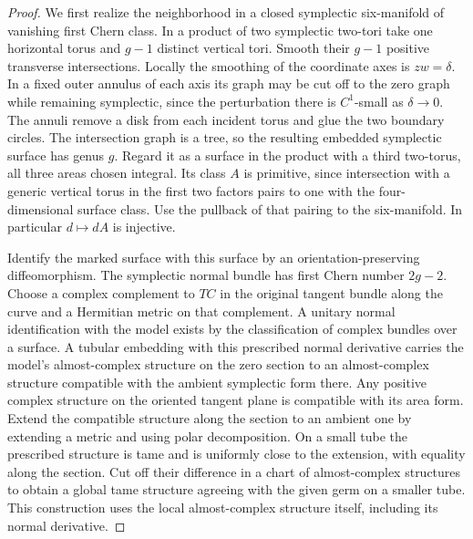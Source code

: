 \begin{proof}
We first realize the neighborhood in a closed symplectic six-manifold
of vanishing first Chern class. In a product of two symplectic
two-tori take one horizontal torus and $g-1$ distinct vertical tori.
Smooth their $g-1$ positive transverse intersections. Locally the
smoothing of the coordinate axes is $zw=\delta$. In a fixed outer
annulus of each axis its graph may be cut off to the zero graph while
remaining symplectic, since the perturbation there is $C^1$-small
as $\delta\to0$. The annuli remove a disk from each incident torus
and glue the two boundary circles. The intersection graph is a tree,
so the resulting embedded symplectic surface has genus $g$. Regard it
as a surface in the product with a third two-torus, all three areas
chosen integral. Its class $A$ is primitive, since intersection with
a generic vertical torus in the first two factors pairs to one with
the four-dimensional surface class. Use the pullback of that pairing
to the six-manifold. In particular $d\mapsto dA$ is injective.

Identify the marked surface with this surface by an orientation-preserving
diffeomorphism. The symplectic normal bundle has first Chern number
$2g-2$. Choose a complex complement to $TC$ in the original tangent bundle along the curve and a Hermitian metric on that complement. A unitary normal identification with the model exists by the
classification of complex bundles over a surface. A tubular embedding
with this prescribed normal derivative carries the model's almost-complex
structure on the zero section to an almost-complex structure compatible
with the ambient symplectic form there. Any positive complex structure
on the oriented tangent plane is compatible with its area form.
Extend the compatible structure along the section to an ambient one
by extending a metric and using polar decomposition. On a small tube
the prescribed structure is tame and is uniformly close to the
extension, with equality along the section. Cut off their difference
in a chart of almost-complex structures to obtain a global tame
structure agreeing with the given germ on a smaller tube. This
construction uses the local almost-complex structure itself, including
its normal derivative.


\end{proof}
